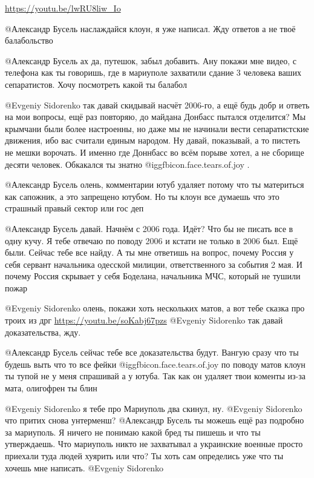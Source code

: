 \begin{multicols}{2}
\begin{itemize}
\url{https://youtu.be/lwRU8liw_Io} 


 @Александр Бусель  наслаждайся клоун, я уже написал. Жду ответов а не твоё балабольство

@Александр Бусель  ах да, путешок, забыл добавить. Ану покажи мне видео, с
телефона как ты говоришь, где в мариуполе захватили сдание 3 человека ваших
сепаратистов. Хочу посмотреть какой ты балабол


@Evgeniy Sidorenko  так давай скидывай насчёт 2006-го, а ещё будь добр и
ответь на мои вопросы, ещё раз повторяю, до майдана Донбасс пытался отделится?
Мы крымчани были более настроенны, но даже мы не начинали вести сепаратистские
движения, ибо вас считали единым народом. Ну давай, показывай, а то пистеть не
мешки ворочать. И именно где Доннбасс во всём порыве хотел, а не сборище
десяти человек. Обкакался ты знатно  @igg{fbicon.face.tears.of.joy} .


@Александр Бусель  олень, комментарии ютуб удаляет потому что ты материться как
сапожник, а это запрещено ютубом. Но ты клоун все думаешь что это страшный
правый сектор или гос деп 


@Александр Бусель  давай. Начнём с 2006 года. Идёт? Что бы не писать все в
одну кучу. Я тебе отвечаю по поводу 2006 и кстати не только в 2006 был. Ещё
были. Сейчас тебе все найду. А ты мне ответишь на вопрос, почему Россия у себя
сервант начальника одесской милиции, ответственного за события 2 мая. И почему
Россия скрывает у себя Боделана, начальника МЧС, который не тушили пожар 

 @Evgeniy Sidorenko  олень, покажи хоть нескольких матов, а вот тебе сказка про
 троих из дрг \url{https://youtu.be/soKabj67pzs}
 @Evgeniy Sidorenko  так давай доказательства, жду.

@Александр Бусель  сейчас тебе все доказательства будут. Вангую сразу что ты
будешь выть что то все фейки @igg{fbicon.face.tears.of.joy}  по поводу матов клоун ты тупой не у меня
спрашивай а у ютуба. Так как он удаляет твои коменты из-за мата, олигофрен ты
блин 

 @Evgeniy Sidorenko  я тебе про Мариуполь два скинул, ну.
 @Evgeniy Sidorenko  что притих снова унтерменш?
 @Александр Бусель  ты можешь ещё раз подробно за мариуполь. Я ничего не понимаю какой бред ты пишешь и что ты утверждаешь. Что мариуполь никто не захватывал а украинские военные просто приехали туда людей хуярить или что? Ты хоть сам определись уже что ты хочешь мне написать.
 @Evgeniy Sidorenko  


\end{itemize}
\end{multicols}
